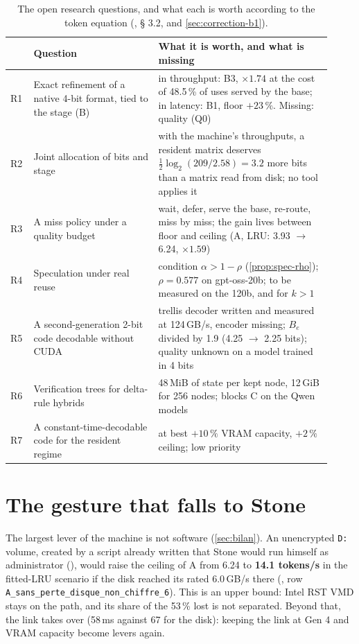 \begin{table}[ht]
\centering\small
\caption[The open research questions]{The open research questions, and what each is worth according to the token equation \calc{} (, § 3.2, and \cref{sec:correction-b1}).}
\label{tab:recherche}
\begin{tabular}{@{}p{0.06\linewidth}p{0.36\linewidth}p{0.5\linewidth}@{}}
\toprule
& Question & What it is worth, and what is missing \\
\midrule
R1 & Exact refinement of a native 4-bit format, tied to the stage (B) & in throughput: B3, $\times 1.74$ at the cost of 48.5\,\% of uses served by the base; in latency: B1, floor $+23\,\%$. Missing: quality (Q0) \\
R2 & Joint allocation of bits and stage & with the machine's throughputs, a resident matrix deserves $\tfrac12 \log_2(209/2.58) = 3.2$ more bits than a matrix read from disk; no tool applies it \\
R3 & A miss policy under a quality budget & wait, defer, serve the base, re-route, miss by miss; the gain lives between floor and ceiling (A, LRU: 3.93 $\to$ 6.24, $\times 1.59$) \\
R4 & Speculation under real reuse & condition $\alpha > 1 - \rho$ (\cref{prop:spec-rho}); $\rho = 0.577$ on gpt-oss-20b; to be measured on the 120b, and for $k > 1$ \\
R5 & A second-generation 2-bit code decodable without CUDA & trellis decoder written and measured at 124\,GB/s, encoder missing; $B_e$ divided by 1.9 (4.25 $\to$ 2.25 bits); quality unknown on a model trained in 4 bits \\
R6 & Verification trees for delta-rule hybrids & 48\,MiB of state per kept node, 12\,GiB for 256 nodes; blocks C on the Qwen models \\
R7 & A constant-time-decodable code for the resident regime & at best $+10\,\%$ VRAM capacity, $+2\,\%$ ceiling; low priority \\
\bottomrule
\end{tabular}
\end{table}

\section{The gesture that falls to Stone}\label{sec:geste-stone}

The largest lever of the machine is not software (\cref{sec:bilan}). An unencrypted \texttt{D:} volume, created by a script already written that Stone would run himself as administrator (), would raise the ceiling of A from 6.24 to \textbf{14.1 tokens/s} in the fitted-LRU scenario if the disk reached its rated 6.0\,GB/s there \calc{} (, row \texttt{A\_sans\_perte\_disque\_non\_chiffre\_6}). This is an upper bound: Intel RST VMD stays on the path, and its share of the 53\,\% lost is not separated. Beyond that, the link takes over (58\,ms against 67 for the disk): keeping the link at Gen 4 and VRAM capacity become levers again.


